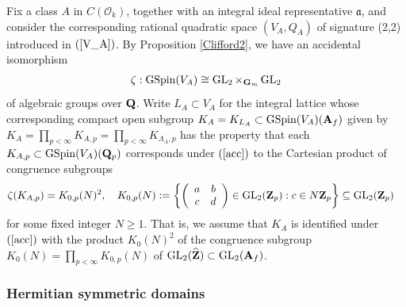 \documentclass{amsart}
\theoremstyle{definition}
\theoremstyle{definition}
\theoremstyle{definition}
\begin{document}
Fix a class $A$ in $C(\mathcal{O}_k)$, together with an integral ideal representative $\mathfrak{a}$,
and consider the corresponding rational quadratic space $(V_A, Q_A)$ of signature (2,2) introduced in $(\ref{V_A})$. 
By Proposition \ref{Clifford2}, we have an accidental isomorphism
\begin{align}\label{acc} \zeta: \operatorname{GSpin}(V_A) \cong  \operatorname{GL}_2 \times_{{\bf{G}}_m} \operatorname{GL}_2 \end{align}
of algebraic groups over ${\bf{Q}}$. Write $L_A \subset V_A$
for the integral lattice whose corresponding compact open subgroup 
$K_A = K_{L_A} \subset \operatorname{GSpin}(V_A)({\bf{A}}_f)$
given by $K_A = \prod_{p < \infty} K_{A, p} = \prod_{p < \infty} K_{\Lambda_A, p}$
has the property that each $K_{A,p} \subset \operatorname{GSpin}(V_A)({\bf{Q}}_p)$
corresponds under $(\ref{acc})$ to the Cartesian product of congruence subgroups
\begin{align}\label{ll} \zeta(K_{A, p}) &= K_{0, p}(N)^2, \quad K_{0, p}(N) :=
\left\lbrace \left(\begin{array}{cc}  a & b \\ c & d \end{array} \right) \in \operatorname{GL}_2({\bf{Z}}_p):
c \in N {\bf{Z}}_p \right\rbrace \subseteq \operatorname{GL}_2({\bf{Z}}_p) \end{align}
for some fixed integer $N \geq 1$. That is, we assume that $K_A$ is identified under $(\ref{acc})$
with the product $K_0(N)^2$ of the congruence subgroup $K_0(N) = \prod_{p < \infty} K_{0, p}(N)$ of 
$\operatorname{GL}_2(\widehat{\bf{Z}}) \subset \operatorname{GL}_2({\bf{A}}_f)$.

\subsubsection{Hermitian symmetric domains}
\end{document}
